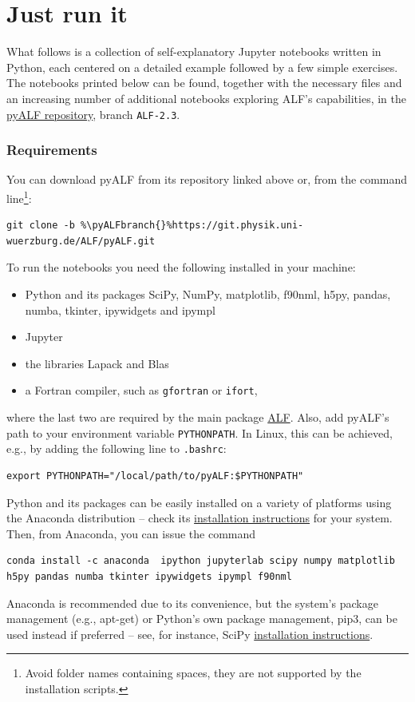 \documentclass[10pt,modern]{scrartcl}
\numberwithin{exerciseitem}{exercise} %
\newcommand{\ALFbranch}{ALF-2.3}   %
\newcommand{\pyALFbranch}{ALF-2.3} %
\begin{document}
\part{Just run it}

What follows is a collection of self-explanatory Jupyter notebooks written in Python, each centered on a detailed example followed by a few simple exercises. The notebooks printed below can be found, together with the necessary files and an increasing number of additional notebooks exploring ALF's capabilities, in the \href{https://git.physik.uni-wuerzburg.de/ALF/pyALF/-/tree/\pyALFbranch}{pyALF repository}, branch \texttt{\pyALFbranch{}}.


\section*{Requirements}

You can download pyALF from its repository linked above or, from the command line\footnote{Avoid folder names containing spaces, they are not supported by the installation scripts.}:
\begin{lstlisting}[style=bash,escapechar=\%]
git clone -b %\pyALFbranch{}%https://git.physik.uni-wuerzburg.de/ALF/pyALF.git
\end{lstlisting}
To run the notebooks you need the following installed in your machine:
\begin{itemize}
	\item Python and its packages SciPy, NumPy, matplotlib, f90nml, h5py, pandas, numba, tkinter, ipywidgets and ipympl
	\item Jupyter
	\item the libraries Lapack and Blas
	\item a Fortran compiler, such as \texttt{gfortran} or \texttt{ifort},
\end{itemize}
where the last two are required by the main package \href{https://git.physik.uni-wuerzburg.de/ALF/ALF/-/tree/\ALFbranch}{ALF}. %
Also, add pyALF's path to your environment variable \texttt{PYTHONPATH}. In Linux, this can be achieved, e.g., by adding the following line to \texttt{.bashrc}:
\begin{lstlisting}[style=bash]
export PYTHONPATH="/local/path/to/pyALF:$PYTHONPATH"
\end{lstlisting}

Python and its packages can be easily installed on a variety of platforms using the Anaconda distribution -- check its \href{https://docs.anaconda.com/anaconda/install/}{installation instructions} for your system. Then, from Anaconda, you can issue the command
\begin{lstlisting}[style=bash]
conda install -c anaconda  ipython jupyterlab scipy numpy matplotlib h5py pandas numba tkinter ipywidgets ipympl f90nml
\end{lstlisting}
Anaconda is recommended due to its convenience, but the system's package management (e.g., apt-get) or Python's own package management, pip3, can be used instead if preferred -- see, for instance, SciPy \href{https://www.scipy.org/install.html}{installation instructions}.
\end{document}
